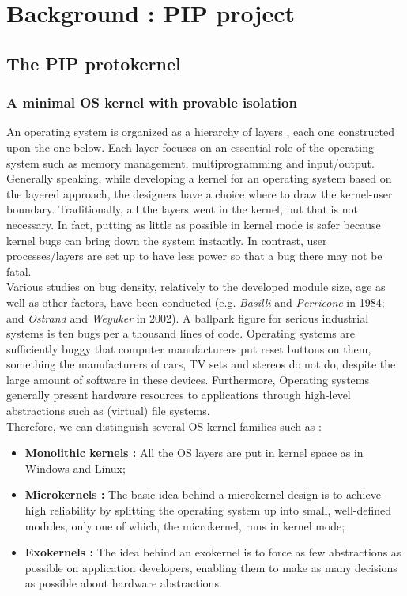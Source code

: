 \chapter{Background : PIP project}

\section{The PIP protokernel}

\subsection{A minimal OS kernel with provable isolation} \label{PIP}
An operating system is organized as a hierarchy  of layers \cite{ModernOS}, each one constructed  upon  the one  below. Each layer focuses on an essential role of the operating system such as memory management, multiprogramming and input/output. Generally speaking, while developing a kernel for an operating system based on the layered  approach, the designers have a choice where to draw the kernel-user boundary. Traditionally, all the layers went in the kernel, but that is not necessary. In fact, putting as little as possible in kernel mode is safer because kernel bugs can bring down the system instantly. In contrast, user processes/layers are set up to have less power so that a bug there may not be fatal.\\

Various studies on bug density, relatively to the developed module size, age as well as other factors, have been conducted (e.g.  \textit{Basilli}  and  \textit{Perricone} in 1984;  and \textit{Ostrand}  and  \textit{Weyuker} in 2002). A  ballpark  figure  for  serious industrial systems is ten  bugs per a thousand  lines  of code. Operating  systems  are  sufficiently  buggy  that  computer  manufacturers  put  reset  buttons  on  them, something  the  manufacturers of cars, TV sets and stereos do  not do,  despite  the  large  amount  of software in these devices. Furthermore, Operating systems generally present hardware resources to applications through high-level abstractions such as (virtual) file systems.\\

\noindent Therefore, we can distinguish several OS kernel families such as : 
\begin{itemize}
	\item \textbf{Monolithic kernels :}  All the OS layers are put in kernel space as in Windows and Linux;
	\item \textbf{Microkernels :} The basic idea  behind a microkernel design  is  to  achieve high reliability  by  splitting the operating  system  up into small, well-defined  modules, only  one  of  which, the  microkernel, runs  in  kernel  mode;
	\item \textbf{Exokernels :} The idea behind an exokernel is to force as few abstractions as possible on application developers, enabling them to make as many decisions as possible about hardware abstractions.
\end{itemize} 

